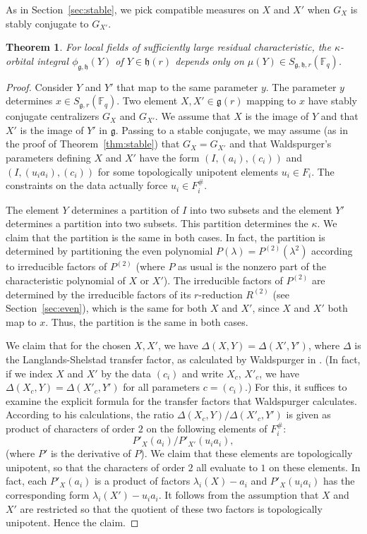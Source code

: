 \documentclass[11pt]{amsart}
\newtheorem{theorem}{Theorem}[section]
\theoremstyle{definition}
\theoremstyle{remark}
\numberwithin{equation}{theorem}
\def\f{{\mathbb{F}_q}}
\def\lie#1{{\mathfrak{#1}}}
\def\orb#1#2{{\phi_{\lie{#1},\lie{#2}}}}
\def\lb{\text{\#}}
\begin{document}
As in Section~\ref{sec:stable}, we pick compatible measures on $X$
and $X'$ when $G_X$ is stably conjugate to $G_{X'}$.

\begin{theorem}\label{thm:kappa}
For local fields of sufficiently large residual characteristic,
the $\kappa$-orbital integral $\orb{g}{h}(Y)$ of $Y\in \lie{h}(r)$
depends only on $\mu(Y)\in S_{\lie{g},\lie{h},r}(\f)$.
\end{theorem}

\begin{proof}  Consider $Y$ and $Y'$ that map to the
same parameter $y$.  The parameter $y$ determines $x\in
S_{\lie{g},r}(\f)$. Two element $X,X'\in\lie{g}(r)$ mapping to $x$
have stably conjugate centralizers $G_X$ and $G_{X'}$.  We assume
that $X$ is the image of $Y$ and that $X'$ is the image of $Y'$ in
$\lie{g}$.  Passing to a stable conjugate, we may assume (as in
the proof of Theorem~\ref{thm:stable}) that $G_X = G_{X'}$ and
that Waldspurger's parameters defining $X$ and $X'$ have the form
$(I,(a_i),(c_i))$ and $(I,(u_i a_i),(c_i))$ for some topologically
unipotent elements $u_i\in F_i$.  The constraints on the data
actually force $u_i\in F_i^\lb$.

The element $Y$ determines a partition of $I$ into two subsets and
the element $Y'$ determines a partition into two subsets. This
partition determines the $\kappa$.  We claim that the partition is
the same in both cases.  In fact, the partition is determined by
partitioning the even polynomial $P(\lambda) = P^{(2)}(\lambda^2)$
according to irreducible factors of $P^{(2)}$ (where $P$ as usual
is the nonzero part of the characteristic polynomial of $X$ or
$X'$).  The irreducible factors of $P^{(2)}$ are determined by the
irreducible factors of its $r$-reduction $R^{(2)}$ (see
Section~\ref{sec:even}), which is the same for both $X$ and $X'$,
since $X$ and $X'$ both map to $x$.  Thus, the partition is the
same in both cases.

We claim that for the chosen $X,X'$, we have
$\Delta(X,Y)=\Delta(X',Y')$, where $\Delta$ is the
Langlands-Shelstad transfer factor, as calculated by Waldspurger
in \cite[Ch.X]{WA}.  (In fact, if we index $X$ and $X'$ by the
data $(c_i)$ and write $X_c$, $X'_c$, we have $\Delta(X_c,Y) =
\Delta(X'_c,Y')$ for all parameters $c=(c_i)$.) For this, it
suffices to examine the explicit formula for the transfer factors
that Waldspurger calculates.  According to his calculations, the
ratio $\Delta(X_c,Y)/\Delta(X'_c,Y')$ is given as product of
characters of order $2$ on the following elements of $F_i^\lb$:
   \begin{equation}
   P'_X(a_i)/P'_{X'}(u_i a_i),
   \end{equation}
(where $P'$ is the derivative of $P$).  We claim that these elements
are topologically unipotent, so that the characters of order $2$ all
evaluate to $1$ on these elements. In fact, each $P'_X(a_i)$ is a
product of factors $\lambda_i(X)-a_i$ and $P'_X(u_i a_i)$ has the
corresponding form $\lambda_i(X')-u_i a_i$.  It follows from the
assumption that $X$ and $X'$ are restricted so that the quotient of
these two factors is topologically unipotent. Hence the claim.


\end{proof}
\end{document}
